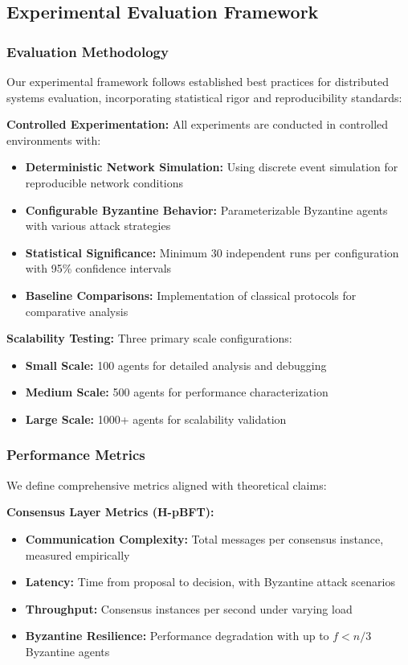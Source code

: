 \documentclass[conference]{IEEEtran}
\begin{document}
\subsection{Experimental Evaluation Framework}

\subsubsection{Evaluation Methodology}

Our experimental framework follows established best practices for distributed systems evaluation, incorporating statistical rigor and reproducibility standards:

\textbf{Controlled Experimentation:} All experiments are conducted in controlled environments with:
\begin{itemize}
    \item \textbf{Deterministic Network Simulation:} Using discrete event simulation for reproducible network conditions
    \item \textbf{Configurable Byzantine Behavior:} Parameterizable Byzantine agents with various attack strategies
    \item \textbf{Statistical Significance:} Minimum 30 independent runs per configuration with 95\% confidence intervals
    \item \textbf{Baseline Comparisons:} Implementation of classical protocols for comparative analysis
\end{itemize}

\textbf{Scalability Testing:} Three primary scale configurations:
\begin{itemize}
    \item \textbf{Small Scale:} 100 agents for detailed analysis and debugging
    \item \textbf{Medium Scale:} 500 agents for performance characterization
    \item \textbf{Large Scale:} 1000+ agents for scalability validation
\end{itemize}

\subsubsection{Performance Metrics}

We define comprehensive metrics aligned with theoretical claims:

\textbf{Consensus Layer Metrics (H-pBFT):}
\begin{itemize}
    \item \textbf{Communication Complexity:} Total messages per consensus instance, measured empirically
    \item \textbf{Latency:} Time from proposal to decision, with Byzantine attack scenarios
    \item \textbf{Throughput:} Consensus instances per second under varying load
    \item \textbf{Byzantine Resilience:} Performance degradation with up to $f < n/3$ Byzantine agents
\end{itemize}
\end{document}

